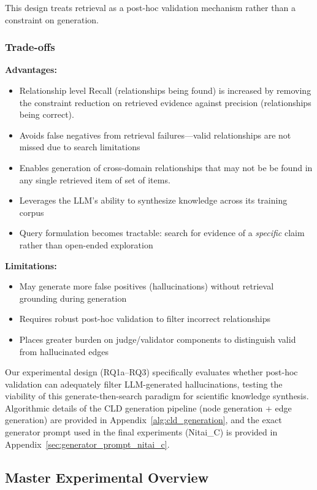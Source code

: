 This design treats retrieval as a post-hoc validation mechanism rather than a constraint on generation. 

\subsubsection{Trade-offs}

\textbf{Advantages:}
\begin{itemize}[noitemsep]
    \item Relationship level Recall (relationships being found) is increased by removing the constraint reduction on retrieved evidence against precision (relationships being correct).
    \item Avoids false negatives from retrieval failures---valid relationships are not missed due to search limitations
    \item Enables generation of cross-domain relationships that may not be be found in any single retrieved item of set of items.
    \item Leverages the LLM's ability to synthesize knowledge across its training corpus
    \item Query formulation becomes tractable: search for evidence of a \textit{specific} claim rather than open-ended exploration
\end{itemize}

\textbf{Limitations:}
\begin{itemize}[noitemsep]
    \item May generate more false positives (hallucinations) without retrieval grounding during generation
    \item Requires robust post-hoc validation to filter incorrect relationships
    \item Places greater burden on judge/validator components to distinguish valid from hallucinated edges
\end{itemize}

Our experimental design (RQ1a--RQ3) specifically evaluates whether post-hoc validation can adequately filter LLM-generated hallucinations, testing the viability of this generate-then-search paradigm for scientific knowledge synthesis.
Algorithmic details of the CLD generation pipeline (node generation + edge generation) are provided in Appendix~\ref{alg:cld_generation}, and the exact generator prompt used in the final experiments (Nitai\_C) is provided in Appendix~\ref{sec:generator_prompt_nitai_c}.

\subsection{Master Experimental Overview}

